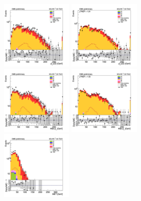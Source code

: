 \begin{figure}[tbp]
  \begin{center}
    \includegraphics[width=0.31\textwidth]{figures/mm_300_SR_april21/hpt0_mm_SR_prefit_plot_apr21.png}
    \includegraphics[width=0.31\textwidth]{figures/mm_300_SR_april21/hpt0_mm_SR_FullPostfit_plot_apr21.png}\\
    \includegraphics[width=0.31\textwidth]{figures/mm_300_SR_april21/hpt1_mm_SR_prefit_plot_apr21.png}
    \includegraphics[width=0.31\textwidth]{figures/mm_300_SR_april21/hpt1_mm_SR_FullPostfit_plot_apr21.png}\\
    \includegraphics[width=0.31\textwidth]{figures/mm_300_SR_april21/met_pt_mm_SR_prefit_plot_apr21.png}

\end{center}
\end{figure}

